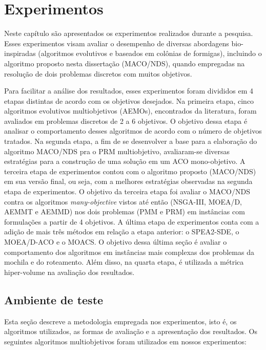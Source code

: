 \chapter[Experimentos]{Experimentos}
\label{chapter_experimentos}

Neste capítulo são apresentados os experimentos realizados durante a pesquisa. Esses experimentos visam avaliar o desempenho de diversas abordagens bio-inspiradas (algoritmos evolutivos e baseados em colônias de formigas), incluindo o algoritmo proposto nesta dissertação (MACO/NDS), quando empregadas na resolução de dois problemas discretos com muitos objetivos. 

Para facilitar a análise dos resultados, esses experimentos foram divididos em 4 etapas distintas de acordo com os objetivos desejados. Na primeira etapa, cinco algoritmos evolutivos multiobjetivos (AEMOs), encontrados da literatura, foram avaliados em problemas discretos de 2 a 6 objetivos. O objetivo dessa etapa é analisar o comportamento desses algoritmos de acordo com o número de objetivos tratados. Na segunda etapa, a fim de se desenvolver a base para a elaboração do algoritmo MACO/NDS pra o PRM multiobjetivo, avaliaram-se diversas estratégias para a construção de uma solução em um ACO mono-objetivo. A terceira etapa de experimentos contou com o algoritmo proposto (MACO/NDS) em sua versão final, ou seja, com a melhores estratégias observadas na segunda etapa de experimentos. O objetivo da terceira etapa foi avaliar o MACO/NDS contra os algoritmos \textit{many-objective} vistos até então (NSGA-III, MOEA/D, AEMMT e AEMMD) nos dois problemas (PMM e PRM) em instâncias com formulações a partir de 4 objetivos. A última etapa de experimentos conta com a adição de mais três métodos em relação a etapa anterior: o SPEA2-SDE, o MOEA/D-ACO e o MOACS. O objetivo dessa última seção é avaliar o comportamento dos algoritmos em instâncias mais complexas dos problemas da mochila e do roteamento. Além disso, na quarta etapa, é utilizada a métrica hiper-volume na avaliação dos resultados.

\section{Ambiente de teste}

Esta seção descreve a metodologia empregada nos experimentos, isto é, os algoritmos utilizados, as formas de avaliação e a apresentação dos resultados. Os seguintes algoritmos multiobjetivos foram utilizados em nossos experimentos:

